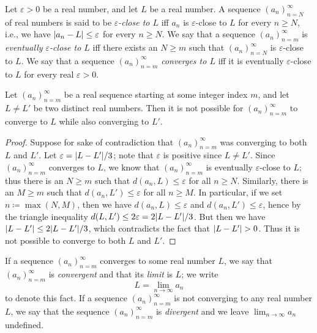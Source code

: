 \begin{definition}\label{6.1.5}
Let \(\varepsilon > 0\) be a real number, and let \(L\) be a real number.
A sequence \((a_n)_{n = N}^\infty\) of real numbers is said to be \emph{\(\varepsilon\)-close to \(L\)} iff \(a_n\) is \(\varepsilon\)-close to \(L\) for every \(n \geq N\), i.e., we have \(\abs*{a_n - L} \leq \varepsilon\) for every \(n \geq N\).
We say that a sequence \((a_n)_{n = m}^\infty\) is \emph{eventually \(\varepsilon\)-close to \(L\)} iff there exists an \(N \geq m\) such that \((a_n)_{n = N}^\infty\) is \(\varepsilon\)-close to \(L\).
We say that a sequence \((a_n)_{n = m}^\infty\) \emph{converges to \(L\)} iff it is eventually \(\varepsilon\)-close to \(L\) for every real \(\varepsilon > 0\).
\end{definition}

\setcounter{theorem}{6}
\begin{proposition}\label{6.1.7}
Let \((a_n)_{n = m}^\infty\) be a real sequence starting at some integer index \(m\), and let \(L \neq L'\) be two distinct real numbers.
Then it is not possible for \((a_n)_{n = m}^\infty\) to converge to \(L\) while also converging to \(L'\).
\end{proposition}

\begin{proof}
Suppose for sake of contradiction that \((a_n)_{n = m}^\infty\) was converging to both \(L\) and \(L'\).
Let \(\varepsilon = \abs*{L - L'} / 3\);
note that \(\varepsilon\) is positive since \(L \neq L'\).
Since \((a_n)_{n = m}^\infty\) converges to \(L\), we know that \((a_n)_{n = m}^\infty\) is eventually \(\varepsilon\)-close to \(L\);
thus there is an \(N \geq m\) such that \(d(a_n, L) \leq \varepsilon\) for all \(n \geq N\).
Similarly, there is an \(M \geq m\) such that \(d(a_n, L') \leq \varepsilon\) for all \(n \geq M\).
In particular, if we set \(n \coloneqq \max(N, M)\), then we have \(d(a_n, L) \leq \varepsilon\) and \(d(a_n, L') \leq \varepsilon\), hence by the triangle inequality \(d(L, L') \leq 2\varepsilon = 2\abs*{L - L'} / 3\).
But then we have \(\abs*{L - L'} \leq 2\abs*{L - L'} / 3\), which contradicts the fact that \(\abs*{L - L'} > 0\).
Thus it is not possible to converge to both \(L\) and \(L'\).
\end{proof}

\begin{definition}\label{6.1.8}
If a sequence \((a_n)_{n = m}^\infty\) converges to some real number \(L\), we say that \((a_n)_{n = m}^\infty\) is \emph{convergent} and that its \emph{limit} is \(L\);
we write
\[
    L = \lim_{n \to \infty} a_n
\]
to denote this fact.
If a sequence \((a_n)_{n = m}^\infty\) is not converging to any real number \(L\), we say that the sequence \((a_n)_{n = m}^\infty\) is \emph{divergent} and we leave \(\lim_{n \to \infty} a_n\) undefined.
\end{definition}

